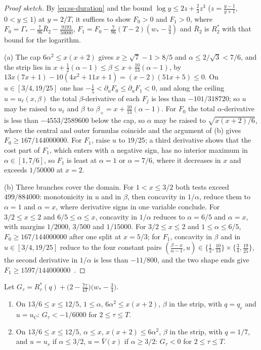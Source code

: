 \begin{proof}[Proof sketch]
By \eqref{eq:ss-duration} and the bound $\log y\le2z+\frac23z^3$ ($z=\frac{y-1}{y+1}$, $0<y\le1$)
at $y=2/T$, it suffices to show $F_0>0$ and $F_1>0$, where
$F_0=\Gamma_*-\frac7{96}\bar R_2-\frac{9193}{50000}$, $F_1=F_0-\frac7{96}(T-2)(w_*-\frac34)$ and
$\bar R_2$ is $R^*_2$ with that bound for the logarithm.

(a) The cap $6\alpha^2\le x(x+2)$ gives $x\ge\sqrt7-1>8/5$ and $\alpha\le2/\sqrt3<7/6$, and the strip
lies in $x+\frac12(\alpha-1)\le\beta\le x+\frac{10}{13}(\alpha-1)$, by
$13x(7x+1)-10(4x^2+11x+1)=(x-2)(51x+5)\le0$. On $u\in[3/4,19/25]$ one has
$-\frac15<\partial_uF_0\le\partial_uF_1<0$, and along the ceiling $u=u_\ell(x,\beta)$ the total
$\beta$-derivative of each $F_j$ is less than $-101/318720$; so $u$ may be raised to $u_\ell$ and
$\beta$ to $\beta_+=x+\frac{10}{13}(\alpha-1)$. For $F_0$ the total $\alpha$-derivative is less
than $-4553/2589600$ below the cap, so $\alpha$ may be raised to $\sqrt{x(x+2)/6}$, where the
central and outer formulas coincide and the argument of (b) gives $F_0\ge167/144000000$. For
$F_1$, raise $u$ to $19/25$; a third derivative shows that the cost part of $F_1$, which enters
with a negative sign, has no interior maximum in $\alpha\in[1,7/6]$, so $F_1$ is least at
$\alpha=1$ or $\alpha=7/6$, where it decreases in $x$ and exceeds $1/50000$ at $x=2$.

(b) Three branches cover the domain. For $1<x\le3/2$ both tests exceed $499/884000$: monotonicity
in $u$ and in $\beta$, then concavity in $1/\alpha$, reduce them to $\alpha=1$ and $\alpha=x$, where
derivative signs in one variable conclude. For $3/2\le x\le2$ and $6/5\le\alpha\le x$, concavity in
$1/\alpha$ reduces to $\alpha=6/5$ and $\alpha=x$, with margins $1/2000$, $3/500$ and $1/15000$.
For $3/2\le x\le2$ and $1\le\alpha\le6/5$, $F_0\ge167/144000000$ after one split at $x=5/3$; for
$F_1$, concavity in $\beta$ and in $u\in[3/4,19/25]$ reduce to the four constant pairs
$(\frac{\beta-x}{\alpha-1},u)\in\{\frac12,\frac{10}{13}\}\times\{\frac34,\frac{19}{25}\}$, the
second derivative in $1/\alpha$ is less than $-11/800$, and the two shape ends give
$F_1\ge1597/144000000$~\cite{LighterProofs}.
\end{proof}

\begin{proposition}\label{prop:ss-face-S2}
Let $G_\tau=R^*_\tau(q)+\bigl(2-\frac{7\tau}{4T}\bigr)\bigl(w_*-\frac34\bigr)$.
\begin{enumerate}[label=(\alph*)]
\item On $13/6\le x\le12/5$, $1\le\alpha$, $6\alpha^2\le x(x+2)$, $\beta$ in the strip, with
  $q=q_c$ and $u=u_C$: $G_\tau<-1/6000$ for $2\le\tau\le T$.
\item On $13/6\le x\le12/5$, $\alpha\le x$, $x(x+2)\le6\alpha^2$, $\beta$ in the strip, with
  $q=1/7$, and $u=u_s$ if $\alpha\le3/2$, $u=\bar V(x)$ if $\alpha\ge3/2$: $G_\tau<0$ for
  $2\le\tau\le T$.
\end{enumerate}
\end{proposition}

